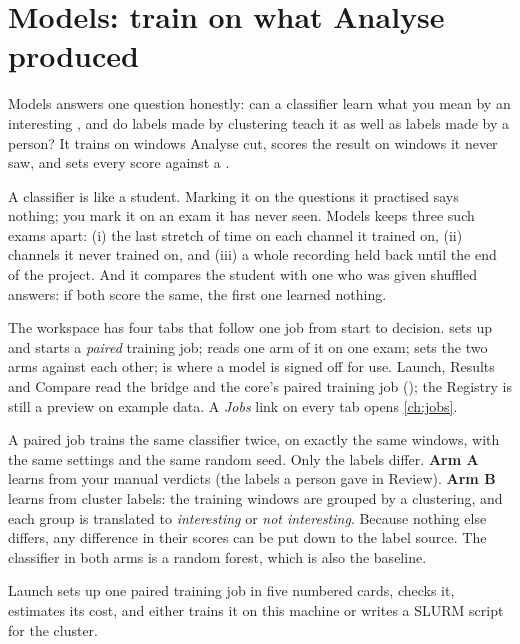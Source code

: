 \chapter{Models: train on what Analyse produced}\label{ch:models}
Models answers one question honestly: can a classifier learn what you mean by an interesting
, and do labels made by clustering teach it as well as labels made by a person?
It trains on windows Analyse cut, scores the result on windows it never saw, and sets every score
against a .

\begin{plainterms}
A classifier is like a student. Marking it on the questions it practised says nothing; you mark it on
an exam it has never seen. Models keeps three such exams apart: (i) the last stretch of time on each
channel it trained on, (ii) channels it never trained on, and (iii) a whole recording held back until
the end of the project. And it compares the student with one who was given shuffled answers: if both
score the same, the first one learned nothing.
\end{plainterms}

The workspace has four tabs that follow one job from start to decision.  sets
up and starts a \emph{paired} training job;  reads one arm of it on one exam;
 sets the two arms against each other;  is where a
model is signed off for use. Launch, Results and Compare read the bridge and the core's paired training
job (); the Registry is still a preview on example data. A \emph{Jobs} link on
every tab opens \cref{ch:jobs}.

\begin{plainterms}
A paired job trains the same classifier twice, on exactly the same windows, with the same settings and
the same random seed. Only the labels differ. \textbf{Arm A} learns from your manual verdicts (the
labels a person gave in Review). \textbf{Arm B} learns from cluster labels: the training windows are
grouped by a clustering, and each group is translated to \emph{interesting} or \emph{not
interesting}. Because nothing else differs, any difference in their scores can be put down to the
label source. The classifier in both arms is a random forest, which is also the baseline.
\end{plainterms}

Launch sets up one paired training job in five numbered cards, checks it, estimates its cost, and
either trains it on this machine or writes a SLURM script for the cluster.

